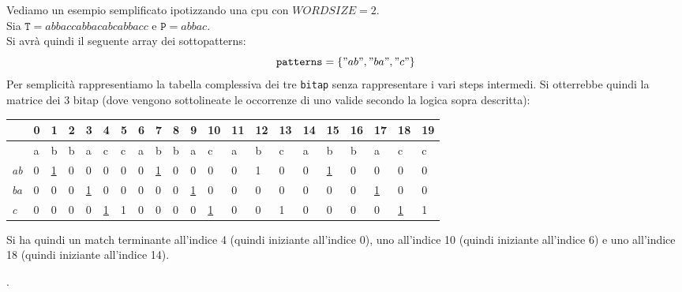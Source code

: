 \documentclass[a4paper,12pt, oneside]{article}
\begin{document}
\begin{esempio}
  Vediamo un esempio semplificato ipotizzando una cpu con
  $WORDSIZE=2$.\\
  Sia $\mathtt{T}=abbaccabbacabcabbacc$ e $\mathtt{P}=abbac$.\\
  Si avrà quindi il seguente array dei sottopatterns:
  \[\mathtt{patterns}=\{"ab", "ba", "c"\}\]
  Per semplicità rappresentiamo la tabella complessiva dei tre
  \texttt{bitap} senza rappresentare i vari steps intermedi. Si
  otterrebbe quindi la matrice dei 3 bitap (dove vengono sottolineate
  le occorrenze di uno valide secondo la logica sopra descritta):
  \begin{center}
    \begin{tabular}{l|l|l|l|l|l|l|l|l|l|l|l|l|l|l|l|l|l|l|l|l|}
      \hline
      & 0 & 1 & 2 & 3 & 4 & 5 & 6 & 7 & 8 & 9 & 10 & 11 & 12 & 13 &
                                                                    14
      & 15 & 16 & 17 & 18 & 19 \\ \hline
      & a & b & b & a & c & c & a & b & b & a & c & a & b & c & a &
                                                                    b
           & b & a & c & c \\ \hline\hline  
      \textit{ab} & 0 & \underline{1} & 0 & 0 & 0 & 0 & 0 &
                                                            \underline{1}
                                      & 0
                                          & 
                                            0
                                              & 0 & 0 & 1 & 0 & 0 &
                                                                    \underline{1} 
           & 0 & 0 & 0 & 0 \\ \hline   
      \textit{ba} & 0 & 0 & 0 & \underline{1} & 0 & 0 & 0 & 0 & 0 &
                                                                    \underline{1}
                                                                    
                                              & 0 & 0 & 0 & 0 & 0 &
                                                                    0
           & 0 & \underline{1} & 0 & 0 \\ \hline   
      \textit{c} & 0 & 0 & 0 & 0 & \underline{1} & 1 & 0 & 0 & 0 & 0
                                              & \underline{1} & 0 &
                                                                    0 & 1 & 0 & 
                                                                                0
           & 0 & 0 & \underline{1} & 1 \\ \hline
    \end{tabular}

  \end{center}
  Si ha quindi un match terminante all'indice 4 (quindi iniziante all'indice
  0), uno all'indice 10 (quindi iniziante all'indice 6)
  e uno all'indice 18 (quindi iniziante all'indice 14).
\end{esempio}.
\end{document}

